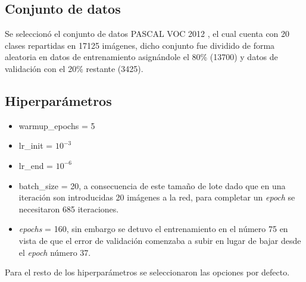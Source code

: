 \subsection{Conjunto de datos}
Se seleccionó el conjunto de datos PASCAL VOC 2012 \cite{pascal-voc-2012}, el cual cuenta con 20 clases repartidas en 17125 imágenes, dicho conjunto fue dividido de forma aleatoria en datos de entrenamiento asignándole el 80\% (13700) y datos de validación con el 20\% restante (3425).
\subsection{Hiperparámetros}
\begin{itemize}
    \item warmup\_epochs = 5
    \item lr\_init = $10^{-3}$
    \item lr\_end = $10^{-6}$
    \item batch\_size = 20, a consecuencia de este tamaño de lote dado que en una iteración son introducidas 20 imágenes a la red, para completar un \textit{epoch} se necesitaron 685 iteraciones.
    \item \textit{epochs} = 160, sin embargo se detuvo el entrenamiento en el número 75 en vista de que el error de validación comenzaba a subir en lugar de bajar desde el \textit{epoch} número 37.
\end{itemize}
Para el resto de los hiperparámetros se seleccionaron las opciones por defecto. 
